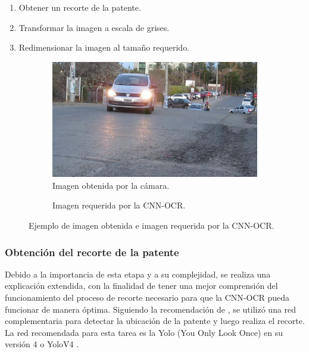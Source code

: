 \begin{enumerate}
    \item Obtener un recorte de la patente.
    \item Transformar la imagen a escala de grises.
    \item Redimensionar la imagen al tamaño requerido.
\end{enumerate}
\begin{figure}[bth]
    \centering
    \begin{subfigure}[b]{0.49\textwidth}
        \centering
        \includegraphics[width=\textwidth]{imgs/imagen-obtenida.jpg}
        \caption{Imagen obtenida por la cámara.}
        \label{fig:imagen-obtenida}
    \end{subfigure}
    \hfill
    \begin{subfigure}[b]{0.49\textwidth}
        \centering
        \vfill
        \caption{Imagen requerida por la CNN-OCR.}
        \label{fig:imagen-requerida}
    \end{subfigure}
    \caption{Ejemplo de imagen obtenida e imagen requerida por la CNN-OCR.}
    \label{fig:Comparativa-imagenes}
\end{figure}

\subsubsection{Obtención del recorte de la patente}

Debido a la importancia de esta etapa y a su complejidad, se realiza una explicación extendida, con la finalidad de tener una mejor comprensión del funcionamiento del proceso de recorte necesario para que la CNN-OCR pueda funcionar de manera óptima. Siguiendo la recomendación de \cite{ankandrew_reconocedor_2023}, se utilizó una red complementaria para detectar la ubicación de la patente y luego realiza el recorte. La red recomendada para esta tarea es la Yolo (You Only Look Once) en su versión 4 o YoloV4 \cite{bochkovskiy_yolov4_2020}.

